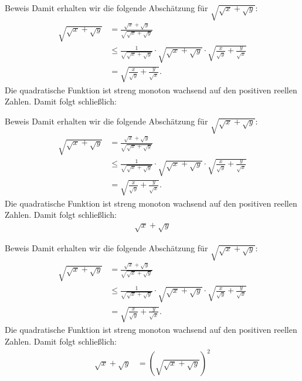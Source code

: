 \documentclass[10pt]{beamer}
\begin{document}
\begin{frame}{Beweis}
    Damit erhalten wir die folgende Abschätzung für \( \sqrt{\sqrt{x} + \sqrt{y}} \):
    \begin{align*}
        \sqrt{\sqrt{x} + \sqrt{y}}
        & = \frac{\sqrt{x} + \sqrt{y}}{\sqrt{\sqrt{x} + \sqrt{y}}} \\
        & \leq \frac{1}{\sqrt{\sqrt{x} + \sqrt{y}}} \cdot \sqrt{\sqrt{x} + \sqrt{y}} \cdot \sqrt{\frac{x}{\sqrt{y}} + \frac{y}{\sqrt{x}}} \\
        & = \sqrt{\frac{x}{\sqrt{y}} + \frac{y}{\sqrt{x}}}.
    \end{align*}
    Die quadratische Funktion ist streng monoton wachsend auf den positiven reellen Zahlen. Damit folgt schließlich:
\end{frame}



\begin{frame}{Beweis}
    Damit erhalten wir die folgende Abschätzung für \( \sqrt{\sqrt{x} + \sqrt{y}} \):
    \begin{align*}
        \sqrt{\sqrt{x} + \sqrt{y}}
        & = \frac{\sqrt{x} + \sqrt{y}}{\sqrt{\sqrt{x} + \sqrt{y}}} \\
        & \leq \frac{1}{\sqrt{\sqrt{x} + \sqrt{y}}} \cdot \sqrt{\sqrt{x} + \sqrt{y}} \cdot \sqrt{\frac{x}{\sqrt{y}} + \frac{y}{\sqrt{x}}} \\
        & = \sqrt{\frac{x}{\sqrt{y}} + \frac{y}{\sqrt{x}}}.
    \end{align*}
    Die quadratische Funktion ist streng monoton wachsend auf den positiven reellen Zahlen. Damit folgt schließlich:
    \begin{align*}
        \sqrt{x} + \sqrt{y}
    \end{align*}
\end{frame}



\begin{frame}{Beweis}
    Damit erhalten wir die folgende Abschätzung für \( \sqrt{\sqrt{x} + \sqrt{y}} \):
    \begin{align*}
        \sqrt{\sqrt{x} + \sqrt{y}}
        & = \frac{\sqrt{x} + \sqrt{y}}{\sqrt{\sqrt{x} + \sqrt{y}}} \\
        & \leq \frac{1}{\sqrt{\sqrt{x} + \sqrt{y}}} \cdot \sqrt{\sqrt{x} + \sqrt{y}} \cdot \sqrt{\frac{x}{\sqrt{y}} + \frac{y}{\sqrt{x}}} \\
        & = \sqrt{\frac{x}{\sqrt{y}} + \frac{y}{\sqrt{x}}}.
    \end{align*}
    Die quadratische Funktion ist streng monoton wachsend auf den positiven reellen Zahlen. Damit folgt schließlich:
    \begin{align*}
        \sqrt{x} + \sqrt{y}
        & = \left( \sqrt{\sqrt{x} + \sqrt{y}} \right)^{2}
    \end{align*}
\end{frame}
\end{document}

